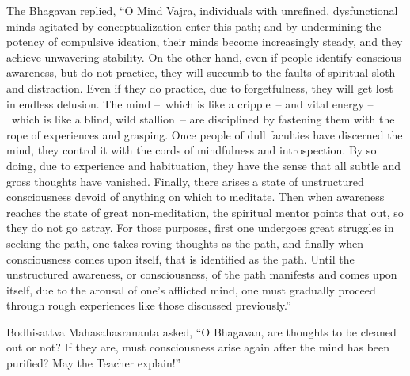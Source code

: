 \documentclass[a4paper,11pt,twoside,final]{book}
\begin{document}
The Bhagavan replied, ``O Mind Vajra, individuals with unrefined,
dysfunctional minds agitated by conceptualization enter this path; and
by undermining the potency of compulsive ideation, their minds become
increasingly steady, and they achieve unwavering stability. On the
other hand, even if people identify conscious awareness, but do not
practice, they will succumb to the faults of spiritual sloth and
distraction. Even if they do practice, due to forgetfulness, they will
get lost in endless delusion.  The mind --~which is like a cripple~--
and vital energy --~which is like a blind, wild stallion~-- are
disciplined by fastening them with the rope of experiences and
grasping. Once people of dull faculties have discerned the mind, they
control it with the cords of mindfulness and introspection. By so
doing, due to experience and habituation, they have the sense that all
subtle and gross thoughts have vanished. Finally, there arises a state
of unstructured consciousness devoid of anything on which to
meditate. Then when awareness reaches the state of great
non-meditation, the spiritual mentor points that out, so they do not
go astray.  For those purposes, first one undergoes great struggles in
seeking the path, one takes roving thoughts as the path, and finally
when consciousness comes upon itself, that is identified as the
path. Until the unstructured awareness, or consciousness, of the path
manifests and comes upon itself, due to the arousal of one's afflicted
mind, one must gradually proceed through rough experiences like those
discussed previously.''

Bodhisattva Mahasahasrananta asked, ``O Bhagavan, are thoughts to be
cleaned out or not? If they are, must consciousness arise again after
the mind has been purified? May the Teacher explain!''
\end{document}
